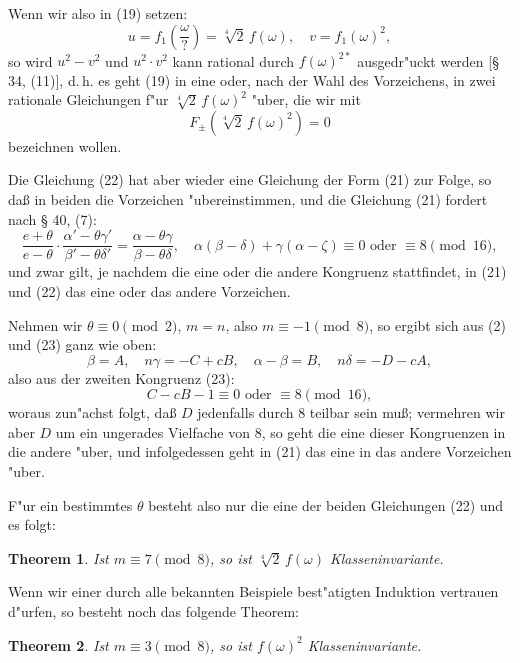 \documentclass[12pt,a4paper]{article}
\theoremstyle{plain}
\newtheorem{theorem}{Theorem}[section]
\theoremstyle{definition}
\theoremstyle{remark}
\begin{document}
Wenn wir also in (19) setzen:
\begin{equation}\label{eq:21}
u = f_1\left(\frac{\omega}{?}\right) = \sqrt[4]{2}\, f(\omega), \quad v = f_1(\omega)^2,
\end{equation}
so wird $u^2 - v^2$ und $u^2 \cdot v^2$ kann rational durch $f(\omega)^{2\ast}$ ausgedr"uckt werden [\S{} 34, (11)], d.\,h. es geht (19) in eine oder, nach der Wahl des Vorzeichens, in zwei rationale Gleichungen f"ur $\sqrt[4]{2}\, f(\omega)^2$ "uber, die wir mit
\begin{equation}\label{eq:22}
F_{\pm}(\sqrt[4]{2}\, f(\omega)^2) = 0
\end{equation}
bezeichnen wollen.

Die Gleichung (22) hat aber wieder eine Gleichung der Form (21) zur Folge, so da\ss{} in beiden die Vorzeichen "ubereinstimmen, und die Gleichung (21) fordert nach \S{} 40, (7):
\begin{equation}\label{eq:23}
\frac{e + \theta}{e - \theta} \cdot \frac{\alpha' - \theta\gamma'}{\beta' - \theta\delta'} = \frac{\alpha - \theta\gamma}{\beta - \theta\delta},
\quad \alpha(\beta - \delta) + \gamma(\alpha - \zeta) \equiv 0 \text{ oder } \equiv 8 \pmod{16},
\end{equation}
und zwar gilt, je nachdem die eine oder die andere Kongruenz stattfindet, in (21) und (22) das eine oder das andere Vorzeichen.

Nehmen wir $\theta \equiv 0 \pmod{2}$, $m = n$, also $m \equiv -1 \pmod{8}$, so ergibt sich aus (2) und (23) ganz wie oben:
\[
\beta = A, \quad n\gamma = -C + cB, \quad \alpha - \beta = B, \quad n\delta = -D - cA,
\]
also aus der zweiten Kongruenz (23):
\[
C - cB - 1 \equiv 0 \text{ oder } \equiv 8 \pmod{16},
\]
woraus zun"achst folgt, da\ss{} $D$ jedenfalls durch 8 teilbar sein mu\ss{}; vermehren wir aber $D$ um ein ungerades Vielfache von 8, so geht die eine dieser Kongruenzen in die andere "uber, und infolgedessen geht in (21) das eine in das andere Vorzeichen "uber.

F"ur ein bestimmtes $\theta$ besteht also nur die eine der beiden Gleichungen (22) und es folgt:

\begin{theorem}
Ist $m \equiv 7 \pmod{8}$, so ist $\sqrt[4]{2}\, f(\omega)$ Klasseninvariante.
\end{theorem}

Wenn wir einer durch alle bekannten Beispiele best"atigten Induktion vertrauen d"urfen, so besteht noch das folgende Theorem:

\begin{theorem}
Ist $m \equiv 3 \pmod{8}$, so ist $f(\omega)^2$ Klasseninvariante.
\end{theorem}
\end{document}
